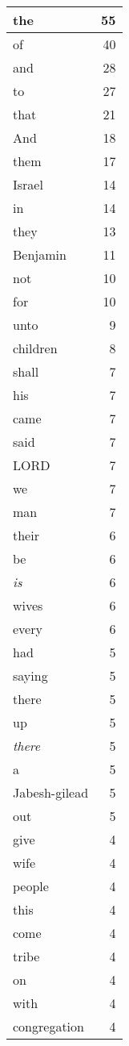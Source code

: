 \begin{center}
\begin{longtable}{l|r}
\hline \hline
\endlastfoot
the & 55 \\ \hline
of & 40 \\ \hline
and & 28 \\ \hline
to & 27 \\ \hline
that & 21 \\ \hline
And & 18 \\ \hline
them & 17 \\ \hline
Israel & 14 \\ \hline
in & 14 \\ \hline
they & 13 \\ \hline
Benjamin & 11 \\ \hline
not & 10 \\ \hline
for & 10 \\ \hline
unto & 9 \\ \hline
children & 8 \\ \hline
shall & 7 \\ \hline
his & 7 \\ \hline
came & 7 \\ \hline
said & 7 \\ \hline
LORD & 7 \\ \hline
we & 7 \\ \hline
man & 7 \\ \hline
their & 6 \\ \hline
be & 6 \\ \hline
\emph{is} & 6 \\ \hline
wives & 6 \\ \hline
every & 6 \\ \hline
had & 5 \\ \hline
saying & 5 \\ \hline
there & 5 \\ \hline
up & 5 \\ \hline
\emph{there} & 5 \\ \hline
a & 5 \\ \hline
Jabesh-gilead & 5 \\ \hline
out & 5 \\ \hline
give & 4 \\ \hline
wife & 4 \\ \hline
people & 4 \\ \hline
this & 4 \\ \hline
come & 4 \\ \hline
tribe & 4 \\ \hline
on & 4 \\ \hline
with & 4 \\ \hline
congregation & 4 \\ \hline

\end{longtable}
\end{center}

